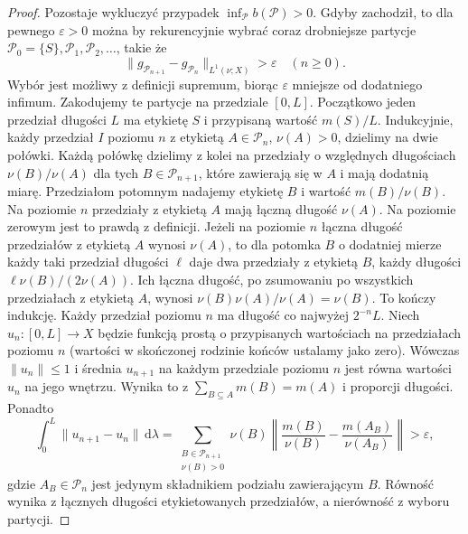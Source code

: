 \begin{proof}
Pozostaje wykluczyć przypadek $\inf_{\mathcal P}b(\mathcal P)>0$.
Gdyby zachodził, to dla pewnego $\varepsilon>0$ można
by rekurencyjnie wybrać coraz drobniejsze partycje
$\mathcal P_0=\{S\},\mathcal P_1,\mathcal P_2,\ldots$,
takie że
\[
 \|g_{\mathcal P_{n+1}}-g_{\mathcal P_n}\|_{L^1(\nu;X)}
 >\varepsilon\quad(n\ge0).
\]
Wybór jest możliwy z definicji supremum, biorąc
$\varepsilon$ mniejsze od dodatniego infimum.
Zakodujemy te partycje na przedziale $[0,L]$.
Początkowo jeden przedział długości $L$ ma etykietę
$S$ i przypisaną wartość $m(S)/L$. Indukcyjnie,
każdy przedział $I$ poziomu $n$ z etykietą
$A\in\mathcal P_n$, $\nu(A)>0$, dzielimy na dwie
połówki. Każdą połówkę dzielimy z kolei na przedziały
o względnych długościach $\nu(B)/\nu(A)$ dla tych
$B\in\mathcal P_{n+1}$, które zawierają się w $A$
i mają dodatnią miarę. Przedziałom potomnym nadajemy
etykietę $B$ i wartość $m(B)/\nu(B)$.
Na poziomie $n$ przedziały z etykietą $A$
mają łączną długość $\nu(A)$. Na poziomie zerowym
jest to prawdą z definicji. Jeżeli na poziomie $n$
łączna długość przedziałów z etykietą $A$ wynosi
$\nu(A)$, to dla potomka $B$ o dodatniej mierze
każdy taki przedział długości $\ell$ daje dwa
przedziały z etykietą $B$, każdy długości
$\ell\nu(B)/(2\nu(A))$. Ich łączna długość, po
zsumowaniu po wszystkich przedziałach z etykietą $A$,
wynosi $\nu(B)\nu(A)/\nu(A)=\nu(B)$.
To kończy indukcję. Każdy przedział poziomu $n$
ma długość co najwyżej $2^{-n}L$.
Niech $u_n:[0,L]\to X$ będzie funkcją prostą
o przypisanych wartościach na przedziałach poziomu $n$
(wartości w skończonej rodzinie końców ustalamy jako zero).
Wówczas $\|u_n\|\le1$ i średnia $u_{n+1}$ na
każdym przedziale poziomu $n$ jest równa wartości
$u_n$ na jego wnętrzu. Wynika to z
$\sum_{B\subseteq A}m(B)=m(A)$ i proporcji długości.
Ponadto
\[
 \int_0^L\|u_{n+1}-u_n\|\,\mathrm d\lambda
 =\sum_{\substack{B\in\mathcal P_{n+1}\\\nu(B)>0}}
 \nu(B)\left\|\frac{m(B)}{\nu(B)}
              -\frac{m(A_B)}{\nu(A_B)}\right\|
 >\varepsilon,
\]
gdzie $A_B\in\mathcal P_n$ jest jedynym składnikiem
podziału zawierającym $B$. Równość wynika z łącznych długości
etykietowanych przedziałów, a nierówność z wyboru
partycji.


\end{proof}
